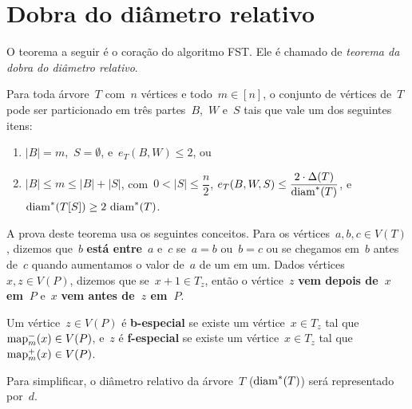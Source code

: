 \section {Dobra do diâmetro relativo}
\label{sec:dobraDiametro}
	O teorema a seguir é o coração do algoritmo FST.
	Ele é chamado de \textit{teorema da dobra do diâmetro relativo}.	



		\begin{teo}
		\label{teo:dobraDiametro}
			Para toda árvore~$T$ com~$n$ vértices e 
			todo~${m\in [n]}$,
			o conjunto de vértices de~$T$ pode ser particionado em 
			três partes~$B$,~$W$ e~$S$ tais que vale um dos 
			seguintes itens:
			\begin{enumerate}
				\item ${|B|=m}$,~${S=\emptyset}$, e~${e_T(B,W)\le 2}$, ou
				\item ${|B|\le m\le |B|+|S|}$, 
				com~${0<|S|\le\dfrac{n}{2}}$,
				${e_T(B,W,S)\le \dfrac{2\cdot 
				\Delta(T)}{\mathrm{diam}^*(T)}}$, 
				e~${\mathrm{diam}^*(T[S])\ge 2\ \mathrm{diam}^*(T)}$.
			\end{enumerate}
		\end{teo}

	\bigskip
	\bigskip
	
	A prova deste teorema usa os seguintes conceitos.
	Para os vértices~${a,b,c\in V(T)}$, dizemos que~$b$
	\textbf{está entre}~$a$ e~$c$ se~${a=b}$ ou~${b=c}$ 
	ou se chegamos em~$b$ antes
	de~$c$ quando aumentamos o valor de~$a$  
	de um em um.
	Dados vértices~${x,z\in V(P)}$, dizemos que 
	se~${x+1\in T_z}$, então o
	vértice~$z$ \textbf{vem depois de~$x$ em~$P$} 
	e~$x$ \textbf{vem antes de~$z$ em~$P$}.


	Um vértice~${z\in V(P)}$ é \textbf{b-especial}
	se existe um vértice~${x\in T_z}$ tal 
	que~${\mathrm{map}^{-}_m(x)\in V(P)}$, e~$z$ é
	\textbf{f-especial} se existe um vértice~${x\in T_z}$
	tal que~${\mathrm{map}^{+}_m(x)\in V(P)}$.

	Para simplificar, o diâmetro relativo da árvore~$T$ ($\mathrm{diam}^*(T)$) 
	será representado por~$d$.

	\bigskip
	\bigskip



